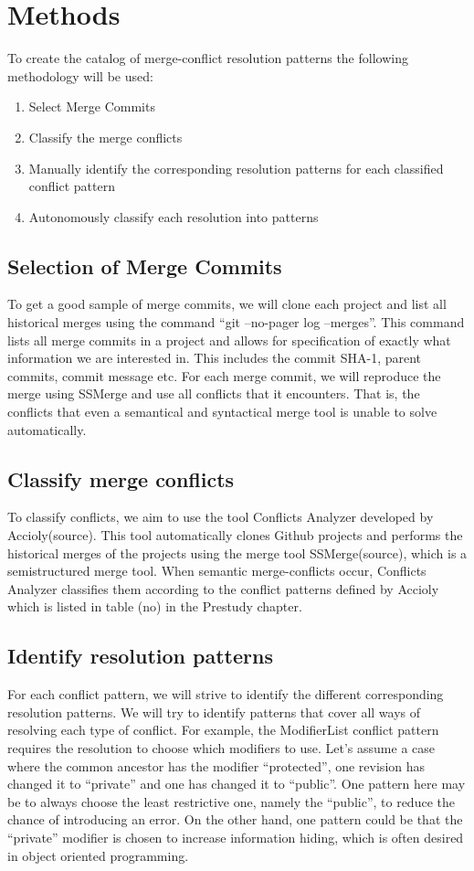 \chapter{Methods}
To create the catalog of merge-conflict resolution patterns the following methodology will be used:
\begin{enumerate}
\item Select Merge Commits
\item Classify the merge conflicts
\item Manually identify the corresponding resolution patterns for each classified conflict pattern
\item Autonomously classify each resolution into patterns
\end{enumerate}
\section{Selection of Merge Commits}
To get a good sample of merge commits, we will clone each project and list all historical merges using the command “git --no-pager log --merges”. This command lists all merge commits in a project and allows for specification of exactly what information we are interested in. This includes the commit SHA-1, parent commits, commit message etc. For each merge commit, we will reproduce the merge using SSMerge and use all conflicts that it encounters. That is, the conflicts that even a semantical and syntactical merge tool is unable to solve automatically.
\section{Classify merge conflicts}
To classify conflicts, we aim to use the tool Conflicts Analyzer developed by Accioly(source). This tool automatically clones Github projects and performs the historical merges of the projects using the merge tool SSMerge(source), which is a semistructured merge tool. When semantic merge-conflicts occur, Conflicts Analyzer classifies them according to the conflict patterns defined by Accioly which is listed in table (no) in the Prestudy chapter.
\section{Identify resolution patterns}
For each conflict pattern, we will strive to identify the different corresponding resolution patterns. We will try to identify patterns that cover all ways of resolving each type of conflict. For example, the ModifierList conflict pattern requires the resolution to choose which modifiers to use. Let's assume a case where the common ancestor has the modifier “protected”, one revision has changed it to “private” and one has changed it to “public”. One pattern here may be to always choose the least restrictive one, namely the “public”, to reduce the chance of introducing an error. On the other hand, one pattern could be that the “private” modifier is chosen to increase information hiding, which is often desired in object oriented programming.

